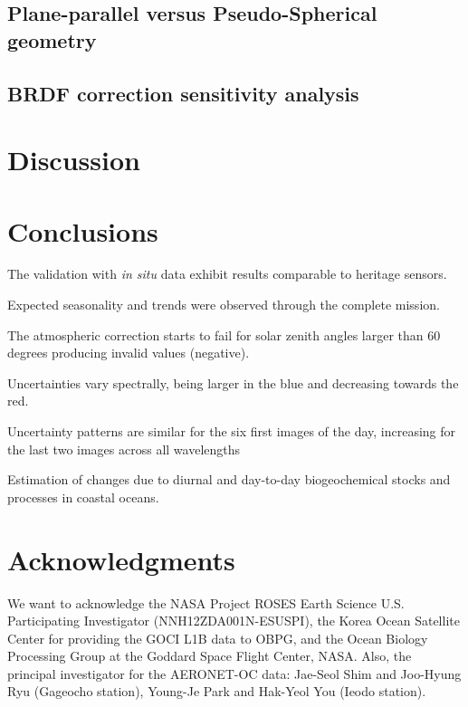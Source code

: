 \documentclass[onecolumn,3p,letterpaper,11pt]{elsarticle}
\begin{document}
\subsection{Plane-parallel versus Pseudo-Spherical geometry}

\subsection{BRDF correction sensitivity analysis}
\section{Discussion}

\section{Conclusions}

The validation with {\it in situ} data exhibit results comparable to heritage sensors.

Expected seasonality and trends were observed through the complete mission.

The atmospheric correction starts to fail for solar zenith angles larger than 60 degrees producing invalid values (negative). 

Uncertainties vary spectrally, being larger in the blue and decreasing towards the red.

Uncertainty patterns are similar for the six first images of the day, increasing for the last two images across all wavelengths

Estimation of changes due to diurnal and day-to-day biogeochemical stocks and processes in coastal oceans.


\section*{Acknowledgments}
\vspace{-.2cm}
We want to acknowledge the NASA Project ROSES Earth Science U.S. Participating Investigator (NNH12ZDA001N-ESUSPI), the Korea Ocean Satellite Center for providing the GOCI L1B data to OBPG, and the Ocean Biology Processing Group at the Goddard Space Flight Center, NASA. Also, the principal investigator for the AERONET-OC data: Jae-Seol Shim and Joo-Hyung Ryu (Gageocho station), Young-Je Park and Hak-Yeol You (Ieodo station).
\end{document}
